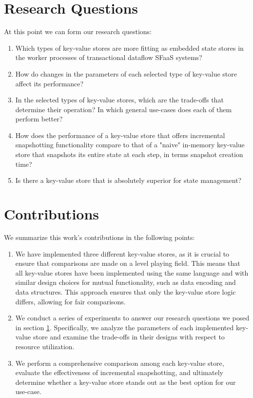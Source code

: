 \section{Research Questions}
\label{section-reseach-questions}

At this point we can form our research questions:

\begin{enumerate}
    \item Which types of key-value stores are more fitting as embedded state stores in the worker processes of transactional dataflow SFaaS systems?
    \item How do changes in the parameters of each selected type of key-value store affect its performance?
    \item In the selected types of key-value stores, which are the trade-offs that determine their operation? In which general use-cases does each of them perform better?
    \item How does the performance of a key-value store that offers incremental snapshotting functionality compare to that of a "naive" in-memory key-value store that snapshots its entire state at each step, in terms snapshot creation time?
    \item Is there a key-value store that is absolutely superior for state management? %
\end{enumerate}

\section{Contributions}

We summarize this work's contributions in the following points:

\begin{enumerate}
    \item We have implemented three different key-value stores, as it is crucial to ensure that comparisons are made on a level playing field. This means that all key-value stores have been implemented using the same language and with similar design choices for mutual functionality, such as data encoding and data structures. This approach ensures that only the key-value store logic differs, allowing for fair comparisons.
    
    \item We conduct a series of experiments to answer our research questions we posed in section \ref{section-reseach-questions}. Specifically, we analyze the parameters of each implemented key-value store and examine the trade-offs in their designs with respect to resource utilization. 
    \item We perform a comprehensive comparison among each key-value store, evaluate the effectiveness of incremental snapshotting, and ultimately determine whether a key-value store stands out as the best option for our use-case.
\end{enumerate}

